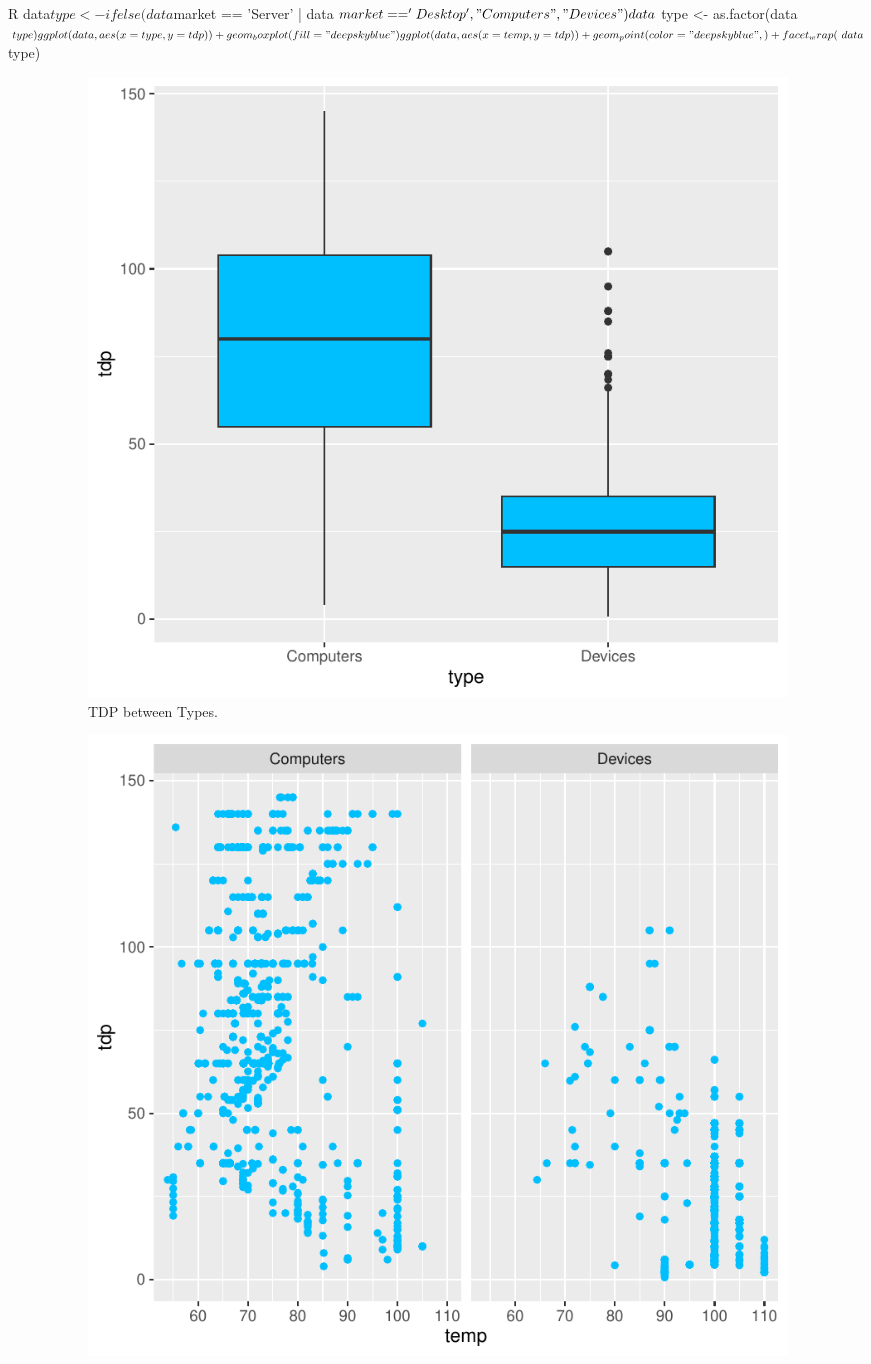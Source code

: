 \begin{itemize}
        \begin{code}{R}
data$type <- ifelse(data$market == 'Server' | data$market == 'Desktop', "Computers", "Devices")
data$type <- as.factor(data$type)

ggplot(data, aes(x = type, y = tdp)) +
geom_boxplot(fill="deepskyblue")
            
ggplot(data, aes(x = temp, y = tdp)) +
geom_point(color="deepskyblue", ) +
facet_wrap(~data$type)
        \end{code}

        \begin{figure}[H]
            \centering
            \begin{subfigure}[]{0.4\textwidth}
                \includegraphics[width=\textwidth]{./graphics/box_tdp_type.pdf}
                \caption{TDP between Types.}
            \end{subfigure}
            \begin{subfigure}[]{0.4\textwidth}
                \includegraphics[width=\textwidth]{./graphics/scatter_type_tdp_temp.pdf}

\end{subfigure}
\end{figure}
\end{itemize}
